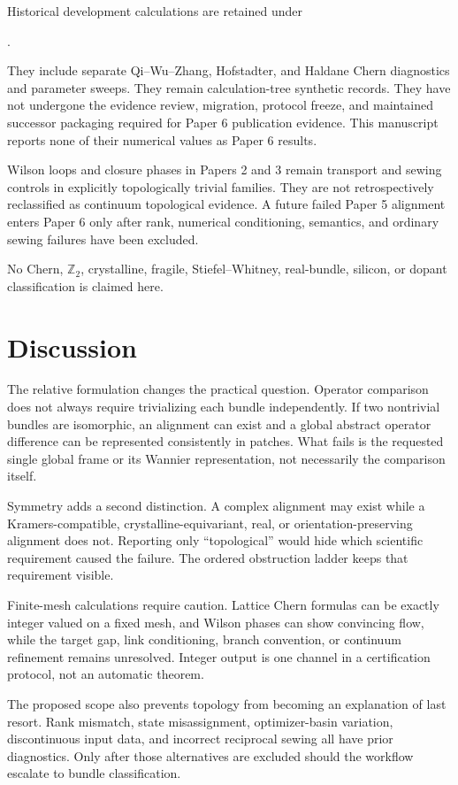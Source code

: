\documentclass[11pt]{article}
\begin{document}
Historical development calculations are retained under
\begin{center}
.
\end{center}
They include separate Qi--Wu--Zhang, Hofstadter, and Haldane Chern diagnostics and
parameter sweeps. They remain calculation-tree synthetic records. They have not undergone
the evidence review, migration, protocol
freeze, and maintained successor packaging required for Paper 6 publication evidence.
This manuscript reports none of their numerical values as Paper 6 results.

Wilson loops and closure phases in Papers 2 and 3 remain transport and sewing controls
in explicitly topologically trivial families. They are not retrospectively reclassified
as continuum topological evidence. A future failed Paper 5 alignment enters Paper 6 only
after rank, numerical conditioning, semantics, and ordinary sewing failures have been
excluded.

No Chern, $\mathbb Z_2$, crystalline, fragile, Stiefel--Whitney, real-bundle, silicon, or
dopant classification is claimed here.

\section{Discussion}
The relative formulation changes the practical question. Operator comparison does not
always require trivializing each bundle independently. If two nontrivial bundles are
isomorphic, an alignment can exist and a global abstract operator difference can be
represented consistently in patches. What fails is the requested single global frame or
its Wannier representation, not necessarily the comparison itself.

Symmetry adds a second distinction. A complex alignment may exist while a
Kramers-compatible, crystalline-equivariant, real, or orientation-preserving alignment
does not. Reporting only ``topological'' would hide which scientific requirement caused
the failure. The ordered obstruction ladder keeps that requirement visible.

Finite-mesh calculations require caution. Lattice Chern formulas can be exactly integer
valued on a fixed mesh, and Wilson phases can show convincing flow, while the target gap,
link conditioning, branch convention, or continuum refinement remains unresolved.
Integer output is one channel in a certification protocol, not an automatic theorem.

The proposed scope also prevents topology from becoming an explanation of last resort.
Rank mismatch, state misassignment, optimizer-basin variation, discontinuous input data,
and incorrect reciprocal sewing all have prior diagnostics. Only after those alternatives
are excluded should the workflow escalate to bundle classification.
\end{document}
